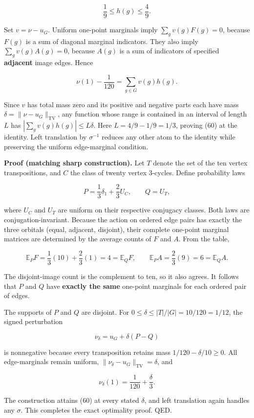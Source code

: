 \documentclass[
  11pt,
]{article}
\begin{document}
\[
\frac19\le h(g)\le\frac49. \tag{62}
\]

Set \(v=\nu-u_G\). Uniform one-point marginals imply
\(\sum_g v(g)F(g)=0\), because \(F(g)\) is a sum of diagonal marginal
indicators. They also imply \(\sum_g v(g)A(g)=0\), because \(A(g)\) is a
sum of indicators of specified \textbf{adjacent} image edges. Hence

\[
\nu(1)-\frac1{120}=\sum_{g\in G}v(g)h(g).
\]

Since \(v\) has total mass zero and its positive and negative parts each
have mass \(\delta=\|\nu-u_G\|_{\mathrm{TV}}\), any function whose range
is contained in an interval of length \(L\) has
\(|\sum_g v(g)h(g)|\le L\delta\). Here \(L=4/9-1/9=1/3\), proving (60)
at the identity. Left translation by \(\sigma^{-1}\) reduces any other
atom to the identity while preserving the uniform edge-marginal
condition.

\textbf{Proof (matching sharp construction).} Let \(T\) denote the set
of the ten vertex transpositions, and \(C\) the class of twenty vertex
3-cycles. Define probability laws

\[
P=\frac13\delta_1+\frac23 U_C,\qquad Q=U_T, \tag{63}
\]

where \(U_C\) and \(U_T\) are uniform on their respective conjugacy
classes. Both laws are conjugation-invariant. Because the action on
ordered edge pairs has exactly the three orbitals (equal, adjacent,
disjoint), their complete one-point marginal matrices are determined by
the average counts of \(F\) and \(A\). From the table,

\[
\mathbb E_P F=\frac13(10)+\frac23(1)=4=\mathbb E_Q F,
\qquad
\mathbb E_P A=\frac23(9)=6=\mathbb E_Q A.
\]

The disjoint-image count is the complement to ten, so it also agrees. It
follows that \(P\) and \(Q\) have \textbf{exactly the same} one-point
marginals for each ordered pair of edges.

The supports of \(P\) and \(Q\) are disjoint. For
\(0\le\delta\le |T|/|G|=10/120=1/12\), the signed perturbation

\[
\nu_\delta=u_G+\delta(P-Q) \tag{64}
\]

is nonnegative because every transposition retains mass
\(1/120-\delta/10\ge0\). All edge-marginals remain uniform,
\(\|\nu_\delta-u_G\|_{\mathrm{TV}}=\delta\), and

\[
\nu_\delta(1)=\frac1{120}+\frac{\delta}{3}.
\]

The construction attains (60) at every stated \(\delta\), and left
translation again handles any \(\sigma\). This completes the exact
optimality proof. QED.
\end{document}
